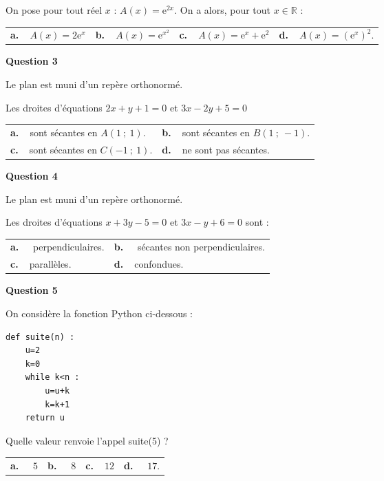 \documentclass[10pt]{article}
\providecommand{\R}{\mathbb{R}}
\providecommand{\e}{{\mathrm{e}}}
\begin{document}
\medskip 

On pose pour tout réel $x$ : $A(x) = \e^{2x}$. On a alors, pour tout $x \in \R$ :

\medskip

\begin{tabularx}{\linewidth}{*{4}{X}}
\textbf{a.~~}$A(x) = 2\e^{x}$ &\textbf{b.~~}$A(x) = \e^{x^2} $  &\textbf{c.~~}$A(x) = \e^x + \e^2$& \textbf{d.~~}$A(x) = \left(\e^x\right)^2$.
\end{tabularx}

\medskip

\textbf{Question 3}

\medskip 


Le plan est muni d'un repère orthonormé.

Les droites d'équations $2x + y + 1 = 0$ et $3x -2y + 5 = 0$

\medskip

\begin{tabularx}{\linewidth}{*{2}{X}}
\textbf{a.~~}sont sécantes en $A(1~;~1)$. & 
\textbf{b.~~}sont sécantes en $B(1~;~-1)$.\\
\textbf{c.~~}sont sécantes en $C(-1~;~1)$.& 
\textbf{d.~~}ne sont pas sécantes. 
\end{tabularx}

\medskip

\textbf{Question 4}

\medskip 

Le plan est muni d'un repère orthonormé.

Les droites d'équations $x + 3y-5 = 0$ et $3x -y+ 6 = 0 $ sont :

\medskip

\begin{tabularx}{\linewidth}{*{2}{X}}
\textbf{a.~~} perpendiculaires. &\textbf{b.~~}  sécantes non perpendiculaires.\\\textbf{c.~~}parallèles.& \textbf{d.~~}confondues.
\end{tabularx}

\medskip

\textbf{Question 5}

\medskip 

On considère la fonction Python ci-dessous :
\begin{lstlisting}[style=python]
def suite(n) :
	u=2
	k=0
	while k<n :
		u=u+k
		k=k+1
	return u
\end{lstlisting}

Quelle valeur renvoie l'appel suite(5) ?

\medskip

\begin{tabularx}{\linewidth}{*{4}{X}}
\textbf{a.~~} $5$ &\textbf{b.~~} $8$&\textbf{c.~~}$12$& \textbf{d.~~} $17$.
\end{tabularx}

\vspace{0,5cm}
\end{document}
